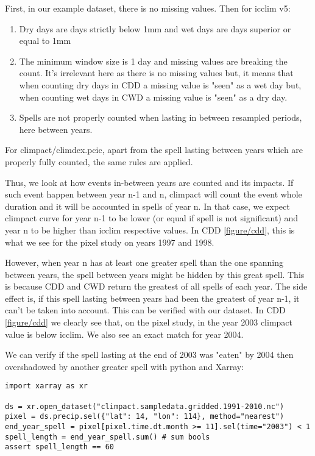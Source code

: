 \documentclass[a4paper,11pt]{article}
\begin{document}
        First, in our example dataset, there is no missing values.
        Then for icclim v5:
        \begin{enumerate}
            \item Dry days are days strictly below 1mm and wet days are days superior or equal to 1mm
            \item The minimum window size is 1 day and missing values are breaking the count. 
                It's irrelevant here as there is no missing values but, it means that when counting dry days in CDD a missing value is "seen" as a wet day but, when counting wet days in CWD a missing value is "seen" as a dry day.
            \item Spells are not properly counted when lasting in between resampled periods, here between years.
        \end{enumerate}
        For climpact/climdex.pcic, apart from the spell lasting between years which are properly fully counted, the same rules are applied.
        
        Thus, we look at how events in-between years are counted and its impacts.
        If such event happen between year n-1 and n, climpact will count the event whole duration and it will be accounted in spells of year n.
        In that case, we expect climpact curve for year n-1 to be lower (or equal if spell is not significant) and year n to be higher than icclim respective values.
        In CDD \ref{figure/cdd}, this is what we see for the pixel study on years 1997 and 1998.

        However, when year n has at least one greater spell than the one spanning between years, the spell between years might be hidden by this great spell.
        This is because CDD and CWD return the greatest of all spells of each year.
        The side effect is, if this spell lasting between years had been the greatest of year n-1, it can't be taken into account.
        This can be verified with our dataset. In CDD \ref{figure/cdd} we clearly see that, on the pixel study, in the year 2003 climpact value is below icclim.
        We also see an exact match for year 2004.
        
        We can verify if the spell lasting at the end of 2003 was "eaten" by 2004 then overshadowed by another greater spell with python and Xarray:
        \begin{minipage}{\linewidth}
        \begin{lstlisting}
import xarray as xr

ds = xr.open_dataset("climpact.sampledata.gridded.1991-2010.nc")
pixel = ds.precip.sel({"lat": 14, "lon": 114}, method="nearest")
end_year_spell = pixel[pixel.time.dt.month >= 11].sel(time="2003") < 1
spell_length = end_year_spell.sum() # sum bools
assert spell_length == 60
        \end{lstlisting}
        \end{minipage}
\end{document}

